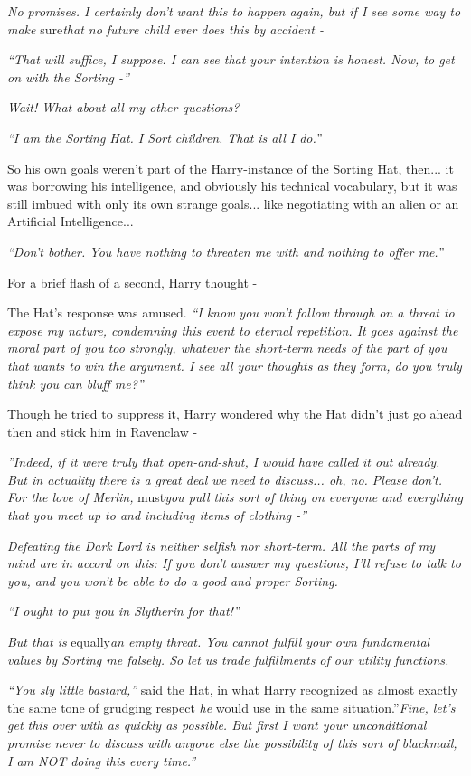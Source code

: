 \emph{No promises. I certainly don't want this to happen again, but if I
see some way to make} sure\emph{that no future child ever does this by
accident -}

\emph{``That will suffice, I suppose. I can see that your intention is
honest. Now, to get on with the Sorting -''}

\emph{Wait! What about all my other questions?}

\emph{``I am the Sorting Hat. I Sort children. That is all I do.''}

So his own goals weren't part of the Harry-instance of the Sorting Hat,
then... it was borrowing his intelligence, and obviously his
technical vocabulary, but it was still imbued with only its own strange
goals... like negotiating with an alien or an Artificial
Intelligence...

\emph{``Don't bother. You have nothing to threaten me with and nothing
to offer me.''}

For a brief flash of a second, Harry thought -

The Hat's response was amused. \emph{``I know you won't follow through
on a threat to expose my nature, condemning this event to eternal
repetition. It goes against the moral part of you too strongly, whatever
the short-term needs of the part of you that wants to win the argument.
I see all your thoughts as they form, do you truly think you can bluff
me?''}

Though he tried to suppress it, Harry wondered why the Hat didn't just
go ahead then and stick him in Ravenclaw -

\emph{''Indeed, if it were truly that open-and-shut, I would have called
it out already. But in actuality there is a great deal we need to
discuss... oh, no. Please don't. For the love of Merlin,}
must\emph{you pull this sort of thing on everyone and everything that
you meet up to and including items of clothing -''}

\emph{Defeating the Dark Lord is neither selfish nor short-term. All the
parts of my mind are in accord on this: If you don't answer my
questions, I'll refuse to talk to you, and you won't be able to do a
good and proper Sorting.}

\emph{``I ought to put you in Slytherin for that!''}

\emph{But that is} equally\emph{an empty threat. You cannot fulfill your
own fundamental values by Sorting me falsely. So let us trade
fulfillments of our utility functions.}

\emph{``You sly little bastard,''} said the Hat, in what Harry
recognized as almost exactly the same tone of grudging respect \emph{he}
would use in the same situation.''\emph{Fine, let's get this over with
as quickly as possible. But first I want your unconditional promise
never to discuss with anyone else the possibility of this sort of
blackmail, I am NOT doing this every time.''}

